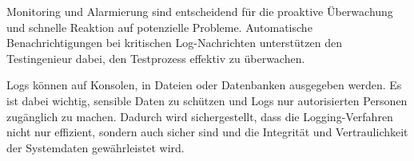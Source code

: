 Monitoring und Alarmierung sind entscheidend für die proaktive Überwachung und schnelle Reaktion auf potenzielle Probleme. Automatische Benachrichtigungen bei kritischen 
Log-Nachrichten unterstützen den Testingenieur dabei, den Testprozess effektiv zu überwachen.
 
Logs können auf Konsolen, in Dateien oder Datenbanken ausgegeben werden. Es ist dabei wichtig, sensible Daten zu schützen und Logs nur autorisierten Personen zugänglich zu machen. 
Dadurch wird sichergestellt, dass die Logging-Verfahren nicht nur effizient, sondern auch sicher sind und die Integrität und Vertraulichkeit der Systemdaten gewährleistet wird.

\citep{Beneken2022} \citep{Gu2023}